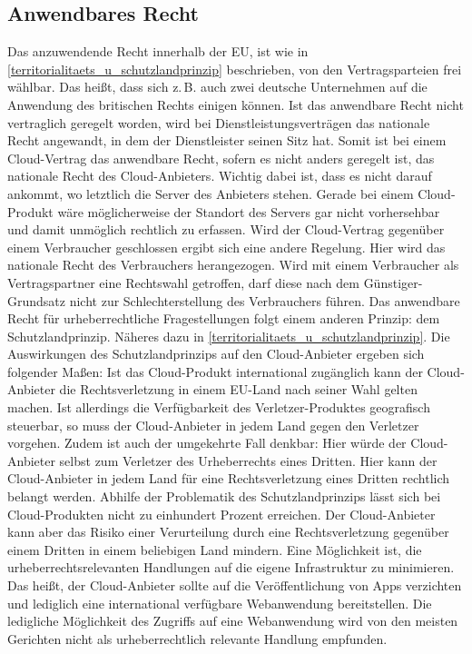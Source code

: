 \subsection{Anwendbares Recht}
Das anzuwendende Recht innerhalb der EU, ist wie in \vref{territorialitaets_u_schutzlandprinzip} beschrieben, von den Vertragsparteien frei w\"ahlbar. Das hei{\ss}t, dass sich z.\,B. auch zwei deutsche Unternehmen auf die Anwendung des britischen Rechts einigen k\"onnen. Ist das anwendbare Recht nicht vertraglich geregelt worden, wird bei Dienstleistungsvertr\"agen das nationale Recht angewandt, in dem der Dienstleister seinen Sitz hat. Somit ist bei einem {\glqq}Cloud-Vertrag{\grqq} das anwendbare Recht, sofern es nicht anders geregelt ist,  das nationale Recht des Cloud-Anbieters. Wichtig dabei ist, dass es nicht darauf ankommt, wo letztlich die Server des Anbieters stehen. Gerade bei einem Cloud-Produkt w\"are m\"oglicherweise der Standort des Servers gar nicht vorhersehbar und damit unm\"oglich rechtlich zu erfassen.\newline
Wird der {\glqq}Cloud-Vertrag{\grqq} gegen\"uber einem Verbraucher geschlossen ergibt sich eine andere Regelung. Hier wird das nationale Recht des Verbrauchers herangezogen. Wird mit einem Verbraucher als Vertragspartner eine Rechtswahl getroffen, darf diese nach dem G\"unstiger-Grundsatz nicht zur Schlechterstellung des Verbrauchers f\"uhren.
Das anwendbare Recht f\"ur urheberrechtliche Fragestellungen folgt einem anderen Prinzip: dem Schutzlandprinzip. N\"aheres dazu in \vref{territorialitaets_u_schutzlandprinzip}.\newline
Die Auswirkungen des Schutzlandprinzips auf den  Cloud-Anbieter ergeben sich folgender Ma{\ss}en:\newline
Ist das Cloud-Produkt international zug\"anglich kann der Cloud-Anbieter die Rechtsverletzung in einem EU-Land nach seiner Wahl gelten machen. Ist allerdings die Verf\"ugbarkeit des Verletzer-Produktes geografisch steuerbar, so muss der Cloud-Anbieter in jedem Land gegen den Verletzer vorgehen. \newline
Zudem ist auch der umgekehrte Fall denkbar: Hier w\"urde der Cloud-Anbieter selbst zum Verletzer des Urheberrechts eines Dritten. Hier kann der Cloud-Anbieter in jedem Land f\"ur eine Rechtsverletzung eines Dritten rechtlich belangt werden. Abhilfe der Problematik des Schutzlandprinzips l\"asst sich bei Cloud-Produkten nicht zu einhundert Prozent erreichen. Der Cloud-Anbieter kann aber das Risiko einer Verurteilung durch eine Rechtsverletzung gegen\"uber einem Dritten in einem beliebigen Land mindern. Eine M\"oglichkeit ist, die urheberrechtsrelevanten Handlungen auf die eigene Infrastruktur zu minimieren. Das hei{\ss}t, der Cloud-Anbieter sollte auf die Ver\"offentlichung von Apps verzichten und lediglich eine international verf\"ugbare Webanwendung bereitstellen. Die ledigliche M\"oglichkeit des Zugriffs auf eine Webanwendung wird von den meisten Gerichten nicht als urheberrechtlich relevante Handlung empfunden. \newline

